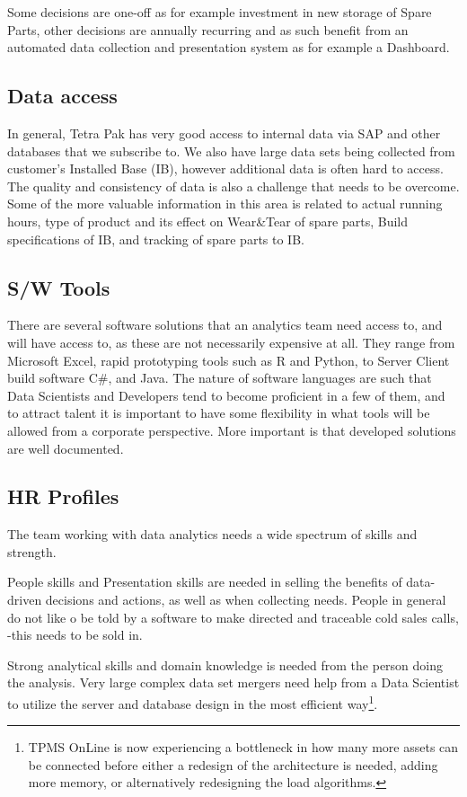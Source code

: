 \documentclass[10pt]{article} %
\begin{document}
Some decisions are one-off as for example investment in new storage of Spare Parts, other decisions are annually recurring and as such benefit from an automated data collection and presentation system as for example a Dashboard.

\subsection{Data access}

In general, Tetra Pak has very good access to internal data via SAP and other databases that we subscribe to. We also have large data sets being collected from customer's Installed Base (IB), however additional data is often hard to access. The quality and consistency of data is also a challenge that needs to be overcome. Some of the more valuable information in this area is related to actual running hours, type of product and its effect on Wear\&Tear of spare parts, Build specifications of IB, and tracking of spare parts to IB.

\subsection{S/W Tools}

There are several software solutions that an analytics team need access to, and will have access to, as these are not necessarily expensive at all. They range from Microsoft Excel, rapid prototyping tools such as R and Python, to Server Client build software C\#, and Java. The nature of software languages are such that Data Scientists and Developers tend to become proficient in a few of them, and to attract talent it is important to have some flexibility in what tools will be allowed from a corporate perspective. More important is that developed solutions are well documented.

\subsection{HR Profiles}

The team working with data analytics needs a wide spectrum of skills and strength. 

People skills and Presentation skills are needed in selling the benefits of data-driven decisions and actions, as well as when collecting needs. People in general do not like o be told by a software to make directed and traceable cold sales calls, -this needs to be sold in.

Strong analytical skills and domain knowledge is needed from the person doing the analysis. Very large complex data set mergers need help from a Data Scientist to utilize the server and database design in the most efficient way\footnote{TPMS OnLine is now experiencing a bottleneck in how many more assets can be connected before either a redesign of the architecture is needed, adding more memory, or alternatively redesigning the load algorithms.}.
\end{document}
